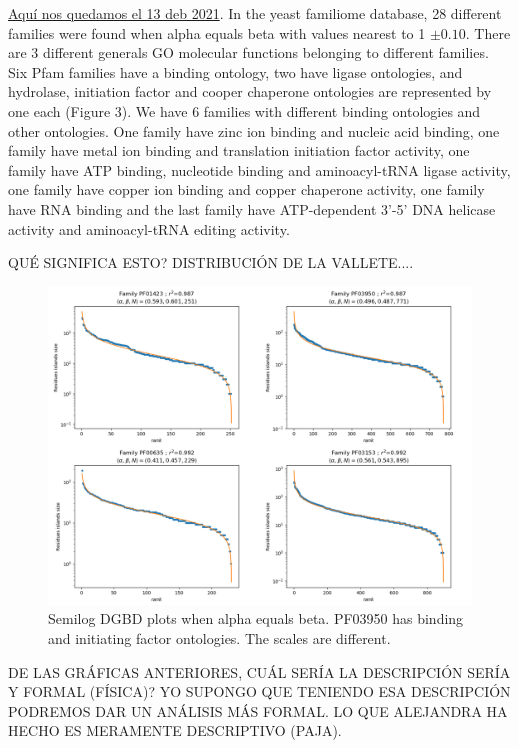 \documentclass[preprint,12pt]{elsarticle}
\begin{document}
\underline{Aquí nos quedamos el 13 deb 2021}. In the yeast familiome 
database, 28 different families were found when alpha equals beta with 
values nearest to 1 $\pm0.10$. There are 3 different generals GO molecular 
functions belonging to different families. Six Pfam families have a 
binding ontology, two have ligase ontologies, and hydrolase, initiation 
factor and cooper chaperone ontologies are represented by one each (Figure 3). 
We have 6 families with different binding ontologies and other ontologies. 
One family have zinc ion binding and nucleic acid binding, one family 
have metal ion binding and translation initiation factor activity, one 
family have ATP binding, nucleotide binding and aminoacyl-tRNA ligase 
activity, one family have copper ion binding and copper chaperone activity, 
one family have RNA binding and the last family have ATP-dependent 3'-5' 
DNA helicase activity and aminoacyl-tRNA editing activity.  \par 
QUÉ SIGNIFICA ESTO? DISTRIBUCIÓN DE LA VALLETE.... \par

\begin{figure} %
    \centering
    \includegraphics[width=13cm]{images/03_mejoresLaVallete.png}
    \bigbreak
    \caption {Semilog DGBD plots when alpha equals beta. PF03950 has binding 
    and initiating factor ontologies. The scales are different.}
    \label{fig:alphabeta}
\end{figure}
\clearpage


\par DE LAS GRÁFICAS ANTERIORES, CUÁL SERÍA LA DESCRIPCIÓN SERÍA Y 
FORMAL (FÍSICA)? YO SUPONGO QUE TENIENDO ESA DESCRIPCIÓN PODREMOS DAR UN 
ANÁLISIS MÁS FORMAL. LO QUE ALEJANDRA HA HECHO ES MERAMENTE DESCRIPTIVO (PAJA). \par
 
\end{document}
